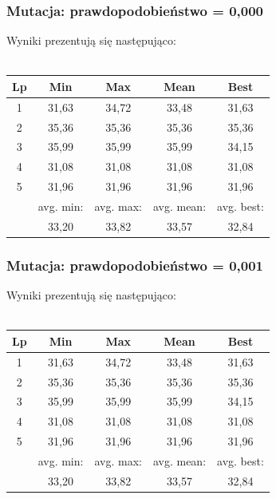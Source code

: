 \documentclass[a4paper,11pt]{article}
\begin{document}
				\subsubsection{Mutacja: prawdopodobieństwo = 0,000}
					Wyniki prezentują się następująco:\\~\\
					\begin{tabular}{|c|c|c|c|c|}
						\hline 
						Lp & Min & Max & Mean & Best \\
						\hline
						1 & 31,63  & 34,72 & 33,48 & 31,63\\\hline
						2 & 35,36 & 35,36  &35,36 & 35,36 \\\hline
						3 & 35,99 & 35,99  & 35,99 &34,15 \\\hline
						4 & 31,08 & 31,08  & 31,08& 31,08 \\\hline
						5 & 31,96 & 31,96  & 31,96 & 31,96\\\hline
						&avg. min:&avg. max:&avg. mean:&avg. best:\\\hline
						& 33,20 & 33,82& 33,57 &32,84\\\hline
					\end{tabular} 
				\subsubsection{Mutacja: prawdopodobieństwo = 0,001}
					Wyniki prezentują się następująco:\\~\\
					\begin{tabular}{|c|c|c|c|c|}
						\hline 
						Lp & Min & Max & Mean & Best \\
						\hline
						1 & 31,63  & 34,72 & 33,48 & 31,63\\\hline
						2 & 35,36 & 35,36  &35,36 & 35,36 \\\hline
						3 & 35,99 & 35,99  & 35,99 &34,15 \\\hline
						4 & 31,08 & 31,08  & 31,08& 31,08 \\\hline
						5 & 31,96 & 31,96  & 31,96 & 31,96\\\hline
						&avg. min:&avg. max:&avg. mean:&avg. best:\\\hline
						& 33,20 & 33,82& 33,57 &32,84\\\hline
					\end{tabular} 
\end{document}

